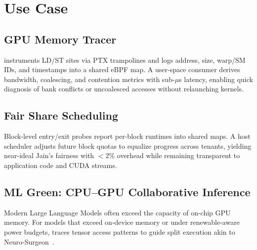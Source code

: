 \section{Use Case}

\subsection{GPU Memory Tracer}\label{sec:use_case_gpu_memory_tracer}
\noindent \sys instruments LD/ST sites via PTX trampolines and logs address, size, warp/SM IDs, and timestamps into a shared eBPF map. A user-space consumer derives bandwidth, coalescing, and contention metrics with sub-\(\mu\)s latency, enabling quick diagnosis of bank conflicts or uncoalesced accesses without relaunching kernels.

\subsection{Fair Share Scheduling}\label{sec:use_case_fair_share}
\noindent Block-level entry/exit probes report per-block runtimes into shared maps. A host scheduler adjusts future block quotas to equalize progress across tenants, yielding near-ideal Jain's fairness with \(<2\%\) overhead while remaining transparent to application code and CUDA streams.

\subsection{ML Green: CPU–GPU Collaborative Inference}
\noindent Modern Large Language Models often exceed the capacity of on-chip GPU memory. For models that exceed on-device memory or under renewable-aware power budgets, \sys traces tensor access patterns to guide split execution akin to Neuro-Surgeon~\cite{neurosurgeon}.

